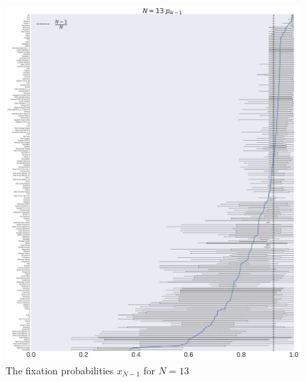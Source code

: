 \documentclass[10pt,letterpaper]{article}
\begin{document}
\begin{figure}[!hbtp]
    \centering
    \includegraphics[width=\textwidth]{./boxplot_13_resist.pdf}
    \caption{The fixation probabilities \(x_{N-1}\) for \(N=13\)}
\end{figure}
\end{document}
